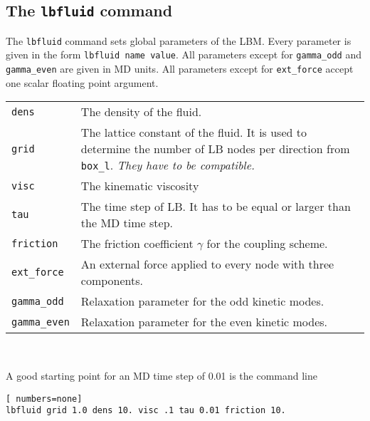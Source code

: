 \subsection*{The \texttt{lbfluid} command}
The \texttt{lbfluid} command sets global parameters of the LBM. Every
parameter is given in the form \texttt{lbfluid name value}. 
All parameters except for \texttt{gamma\_odd} and  \texttt{gamma\_even}
are given in MD units. All parameters except for \texttt{ext\_force} accept
one scalar floating point argument. \\
\vspace{0,2cm}
\begin{tabular}{p{}p{}}
\texttt{dens} & The density of the fluid.\\
\texttt{grid} & The lattice constant of the fluid. It is used to determine the number of LB nodes 
per direction from \texttt{box\_l}. {\em They have to be compatible.} \\
\texttt{visc} & The kinematic viscosity \\
\texttt{tau} & The time step of LB. It has to be equal or larger than the MD time step. \\
\texttt{friction} & The friction coefficient $\gamma$ for the coupling scheme. \\
\texttt{ext\_force} & An external force applied to every node with three components. \\
\texttt{gamma\_odd} & Relaxation parameter for the odd kinetic modes. \\
\texttt{gamma\_even} & Relaxation parameter for the even kinetic modes.
\end{tabular} \\
\vspace{0,2cm}

A good starting point for an MD time step of 0.01 is the command line
\vspace{0,2cm}
\begin{lstlisting}[ numbers=none]
lbfluid grid 1.0 dens 10. visc .1 tau 0.01 friction 10.
\end{lstlisting}
\vspace{0,2cm}

